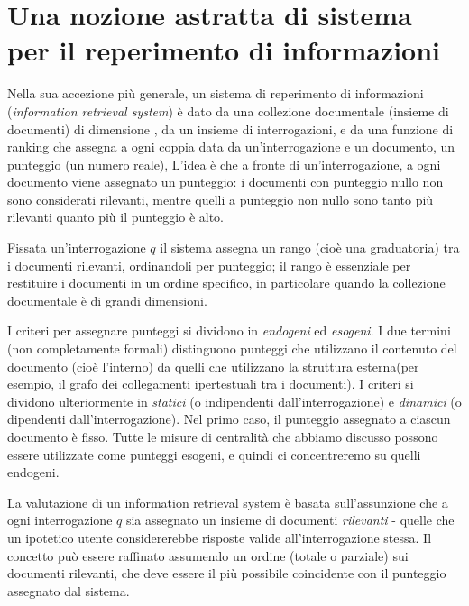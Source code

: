 \chapter{Una nozione astratta di sistema per il reperimento di informazioni}
Nella sua accezione più generale, un sistema di reperimento di informazioni (\textit{information retrieval system}) è dato da una collezione documentale  (insieme di documenti) di dimensione , da un insieme  di interrogazioni, e da una funzione di ranking  che assegna a ogni coppia data da un'interrogazione e un documento, un punteggio (un numero reale), L'idea è che a fronte di un'interrogazione, a ogni documento viene assegnato un punteggio: i documenti con punteggio nullo non sono considerati rilevanti, mentre quelli a punteggio non nullo sono tanto più rilevanti quanto più il punteggio è alto.

Fissata un'interrogazione $q$ il sistema assegna un rango (cioè una graduatoria) tra i documenti rilevanti, ordinandoli per punteggio; il rango è essenziale per restituire i documenti in un ordine specifico, in particolare quando la collezione documentale è di grandi dimensioni.

I criteri per assegnare punteggi si dividono in \textit{endogeni} ed \textit{esogeni}. I due termini (non completamente formali) distinguono punteggi che utilizzano il contenuto del documento (cioè l'interno) da quelli che utilizzano la struttura esterna(per esempio, il grafo dei collegamenti ipertestuali tra i documenti). I criteri si dividono ulteriormente in \textit{statici} (o indipendenti dall'interrogazione) e \textit{dinamici} (o dipendenti dall'interrogazione). Nel primo caso, il punteggio assegnato a ciascun documento è fisso. Tutte le misure di centralità che abbiamo discusso possono essere utilizzate come punteggi esogeni, e quindi ci concentreremo su quelli endogeni.

La valutazione di un information retrieval system è basata sull'assunzione che a ogni interrogazione $q$ sia assegnato un insieme di documenti \textit{rilevanti} - quelle che un ipotetico utente considererebbe risposte valide all'interrogazione stessa. Il concetto può essere raffinato assumendo un ordine (totale o parziale) sui documenti rilevanti, che deve essere il più possibile coincidente con il punteggio assegnato dal sistema.

